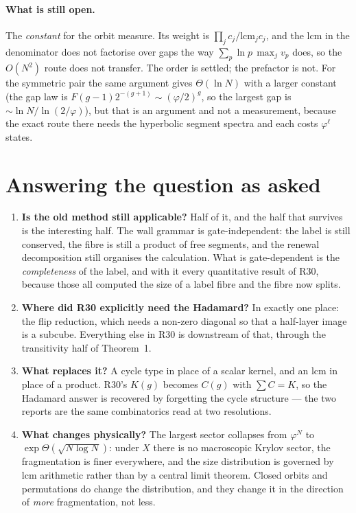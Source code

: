\documentclass[11pt]{article}
\theoremstyle{plain}
\theoremstyle{remark}
\begin{document}
\paragraph{What is still open.} The \emph{constant} for the orbit measure. Its
weight is $\prod_j c_j/\mathrm{lcm}_j c_j$, and the lcm in the denominator does
not factorise over gaps the way $\sum_p\ln p\,\max_j v_p$ does, so the $O(N^2)$
route does not transfer. The order is settled; the prefactor is not. For the
symmetric pair the same argument gives $\Theta(\ln N)$ with a larger constant
(the gap law is $F(g-1)2^{-(g+1)}\sim(\varphi/2)^g$, so the largest gap is
$\sim\ln N/\ln(2/\varphi)$), but that is an argument and not a measurement,
because the exact route there needs the hyperbolic segment spectra and each costs
$\varphi^\ell$ states.

\section{Answering the question as asked}

\begin{enumerate}
\item \textbf{Is the old method still applicable?} Half of it, and the half that
survives is the interesting half. The wall grammar is gate-independent: the label
is still conserved, the fibre is still a product of free segments, and the
renewal decomposition still organises the calculation. What is gate-dependent is
the \emph{completeness} of the label, and with it every quantitative result of
R30, because those all computed the size of a label fibre and the fibre now
splits.

\item \textbf{Where did R30 explicitly need the Hadamard?} In exactly one place:
the flip reduction, which needs a non-zero diagonal so that a half-layer image is
a subcube. Everything else in R30 is downstream of that, through the transitivity
half of Theorem~1.

\item \textbf{What replaces it?} A cycle type in place of a scalar kernel, and an
lcm in place of a product. R30's $K(g)$ becomes $C(g)$ with $\sum C=K$, so the
Hadamard answer is recovered by forgetting the cycle structure --- the two reports
are the same combinatorics read at two resolutions.

\item \textbf{What changes physically?} The largest sector collapses from
$\varphi^N$ to $\exp\Theta(\sqrt{N\log N})$: under $X$ there is no macroscopic
Krylov sector, the fragmentation is finer everywhere, and the size distribution is
governed by lcm arithmetic rather than by a central limit theorem. Closed orbits
and permutations do change the distribution, and they change it in the direction
of \emph{more} fragmentation, not less.
\end{enumerate}
\end{document}
